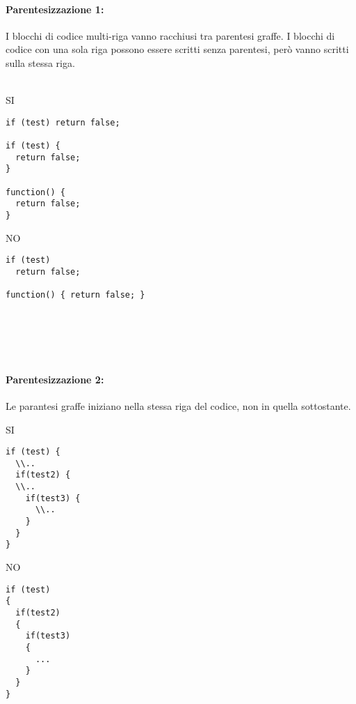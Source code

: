 \documentclass[../processi_primari.tex]{subfiles}
\begin{document}
\paragraph{Parentesizzazione 1:} I blocchi di codice multi-riga vanno racchiusi tra parentesi
graffe. I blocchi di codice con una sola riga possono essere scritti senza parentesi, però vanno scritti sulla stessa riga.\\
\\
\begin{minipage}{6cm}
{\begin{center}SI\end{center}}
\begin{Verbatim}[frame=single]
if (test) return false;

if (test) {
  return false;
}

function() {
  return false;
}
\end{Verbatim}
\end{minipage}
\hfill
\begin{minipage}{7cm}
	{\begin{center}NO\end{center}}
	\begin{Verbatim}[frame=single]
if (test)
  return false;
  
function() { return false; }




  
	\end{Verbatim}
\end{minipage}
\paragraph{Parentesizzazione 2:} Le parantesi graffe iniziano nella stessa riga del codice, non in quella sottostante.\\

\begin{minipage}{6cm}
	{\begin{center}SI\end{center}}
	\begin{Verbatim}[frame=single]
if (test) {
  \\..
  if(test2) {
  \\..
    if(test3) {
	  \\..
    }
  }
}

	\end{Verbatim}
\end{minipage}
\hfill
\begin{minipage}{6cm}
	{\begin{center}NO\end{center}}
	\begin{Verbatim}[frame=single]
if (test) 
{
  if(test2)
  {
    if(test3)
    {
      ...
    }
  }
}
	\end{Verbatim}
\end{minipage}	
\end{document}
